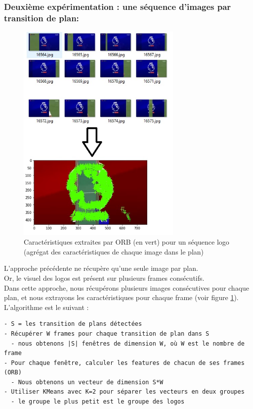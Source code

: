 \documentclass[11pt]{article}
\begin{document}
\subsubsection{Deuxième expérimentation : une séquence d'images par transition de plan:}
\label{sec:orgd90b786}
\begin{figure}[htbp]
\centering
\includegraphics[width=8cm]{akaze_window_res.jpg}
\caption{Caractéristiques extraites par ORB (en vert) pour un séquence logo (agrégat des caractéristiques de chaque image dans le plan) \label{orb-window}}
\end{figure}
L'approche précédente ne récupère qu'une seule image par plan.\\
Or, le visuel des logos est présent sur plusieurs frames consécutifs.\\
Dans cette approche, nous récupérons plusieurs images consécutives pour chaque plan, et nous extrayons les caractéristiques pour chaque frame (voir figure \ref{orb-window}).\\

L'algorithme est le suivant :\\
\begin{verbatim}
- S = les transition de plans détectées
- Récupérer W frames pour chaque transition de plan dans S
  - nous obtenons |S| fenêtres de dimension W, où W est le nombre de frame
- Pour chaque fenêtre, calculer les features de chacun de ses frames (ORB)
  - Nous obtenons un vecteur de dimension S*W
- Utiliser KMeans avec K=2 pour séparer les vecteurs en deux groupes
  - le groupe le plus petit est le groupe des logos
\end{verbatim}
\end{document}
